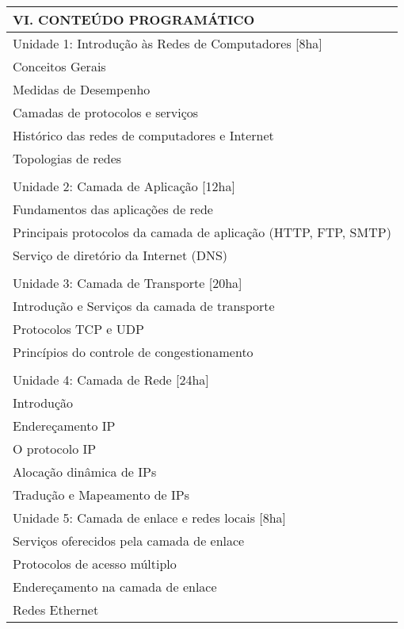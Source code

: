\documentclass[12pt]{article}
\begin{document}
\begin{longtable}{|L{1.025\textwidth}|} \hline
%
{\bf VI. CONTEÚDO PROGRAMÁTICO } \\ \hline
Unidade 1: Introdução às Redes de Computadores [8ha]\\
Conceitos Gerais	\\
Medidas de Desempenho\\
Camadas de protocolos e serviços\\
Histórico das redes de computadores e Internet\\
Topologias de redes\\
\\
Unidade 2: Camada de Aplicação [12ha]\\
Fundamentos das aplicações de rede\\
Principais protocolos da camada de aplicação (HTTP, FTP, SMTP)\\
Serviço de diretório da Internet (DNS)\\
\\
Unidade 3: Camada de Transporte [20ha]\\
Introdução e Serviços da camada de transporte\\
Protocolos TCP e UDP\\
Princípios do controle de congestionamento\\
\\
Unidade 4: Camada de Rede [24ha]\\
Introdução\\
Endereçamento IP\\
O protocolo IP\\
Alocação dinâmica de IPs\\
Tradução e Mapeamento de IPs\
\\
Unidade 5: Camada de enlace e redes locais [8ha]\\
Serviços oferecidos pela camada de enlace\\
Protocolos de acesso múltiplo\\
Endereçamento na camada de enlace\\
Redes Ethernet
\\ \hline
\end{longtable} 
\end{document}
